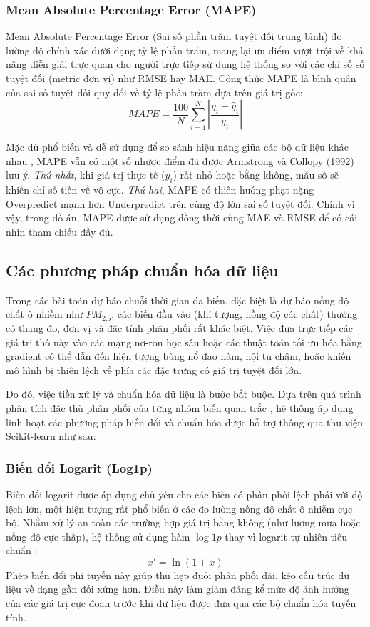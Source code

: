 \subsubsection{Mean Absolute Percentage Error (MAPE)}

Mean Absolute Percentage Error (Sai số phần trăm tuyệt đối trung bình) đo lường độ chính xác dưới dạng tỷ lệ phần trăm, mang lại ưu điểm vượt trội về khả năng diễn giải trực quan cho người trực tiếp sử dụng hệ thống so với các chỉ số số tuyệt đối (metric đơn vị) như RMSE hay MAE. Công thức MAPE là bình quân của sai số tuyệt đối quy đổi về tỷ lệ phần trăm dựa trên giá trị gốc:
\begin{equation}
    MAPE = \frac{100}{N} \sum_{i=1}^{N} \left| \frac{y_i - \hat{y}_i}{y_i} \right|
\end{equation}

Mặc dù phổ biến và dễ sử dụng để so sánh hiệu năng giữa các bộ dữ liệu khác nhau \cite{armstrong1992mape}, MAPE vẫn có một số nhược điểm đã được Armstrong và Collopy (1992) lưu ý. \textit{Thứ nhất}, khi giá trị thực tế ($y_i$) rất nhỏ hoặc bằng không, mẫu số sẽ khiến chỉ số tiến về vô cực. \textit{Thứ hai}, MAPE có thiên hướng phạt nặng Overpredict mạnh hơn Underpredict trên cùng độ lớn sai số tuyệt đối. Chính vì vậy, trong đồ án, MAPE được sử dụng đồng thời cùng MAE và RMSE để có cái nhìn tham chiếu đầy đủ.
\subsection{Các phương pháp chuẩn hóa dữ liệu}

Trong các bài toán dự báo chuỗi thời gian đa biến, đặc biệt là dự báo nồng độ chất ô nhiễm như $PM_{2.5}$, các biến đầu vào (khí tượng, nồng độ các chất) thường có thang đo, đơn vị và đặc tính phân phối rất khác biệt. Việc đưa trực tiếp các giá trị thô này vào các mạng nơ-ron học sâu hoặc các thuật toán tối ưu hóa bằng gradient có thể dẫn đến hiện tượng bùng nổ đạo hàm, hội tụ chậm, hoặc khiến mô hình bị thiên lệch về phía các đặc trưng có giá trị tuyệt đối lớn. 

Do đó, việc tiền xử lý và chuẩn hóa dữ liệu là bước bắt buộc. Dựa trên quá trình phân tích đặc thù phân phối của từng nhóm biến quan trắc \cite{tukey1977eda}, hệ thống áp dụng linh hoạt các phương pháp biến đổi và chuẩn hóa được hỗ trợ thông qua thư viện Scikit-learn \cite{pedregosa2011sklearn} như sau:

\subsubsection{Biến đổi Logarit (Log1p)}
Biến đổi logarit được áp dụng chủ yếu cho các biến có phân phối lệch phải với độ lệch lớn, một hiện tượng rất phổ biến ở các đo lường nồng độ chất ô nhiễm cục bộ. Nhằm xử lý an toàn các trường hợp giá trị bằng không (như lượng mưa hoặc nồng độ cực thấp), hệ thống sử dụng hàm $\log1p$ thay vì logarit tự nhiên tiêu chuẩn \cite{box1964analysis}:
$$x' = \ln(1 + x)$$
Phép biến đổi phi tuyến này giúp thu hẹp đuôi phân phối dài, kéo cấu trúc dữ liệu về dạng gần đối xứng hơn. Điều này làm giảm đáng kể mức độ ảnh hưởng của các giá trị cực đoan trước khi dữ liệu được đưa qua các bộ chuẩn hóa tuyến tính.

